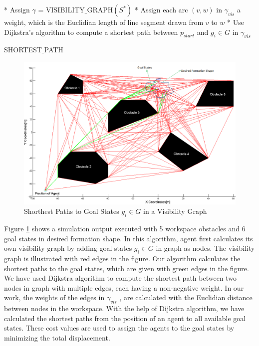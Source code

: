 \documentclass[letterpaper, 10 pt, conference]{ieeeconf}  %
\begin{document}
\begin{algorithm}
* Assign $\gamma$ = VISIBILITY$\_$GRAPH$(S^*)$ \newline
* Assign each arc $(v,w)$ in $\gamma_{vis}$ a weight, which is the Euclidian length of line segment drawn from $v$ to $w$ \newline
{}
{
* Use Dijkstra's algorithm to compute a shortest path between $p_{start}$ and $g_i \in G$ in $\gamma_{vis}$
}
\caption{SHORTEST$\_$PATH}
\end{algorithm}
  
\begin{figure}[thpb]
\centering
\includegraphics[scale = 0.25]{visgraph2}
\caption{Shorthest Paths to Goal States $g_i \in G$ in a Visibility Graph} \label{dijksttae_visibility}
\end{figure}

Figure \ref{dijksttae_visibility} shows a simulation output executed with 5 workspace obstacles and 6 goal states in desired formation shape. In this algorithm, agent first calculates its own visibility graph by adding goal states $g_i \in G$ in graph as nodes. The visibility graph is illustrated with red edges in the figure. Our algorithm calculates the shortest paths to the goal states, which are given with green edges in the figure. We have used Dijkstra algorithm to compute the shortest path between two nodes in graph with multiple edges, each having a non-negative weight. In our work, the weights of the edges in $\gamma_{vis}$ , are calculated with the Euclidian distance between nodes in the workspace. With the help of Dijkstra algorithm, we have calculated the shortest paths from the position of an agent to all available goal states. These cost values are used to assign the agents to the goal states by minimizing the total displacement.  
\end{document}
